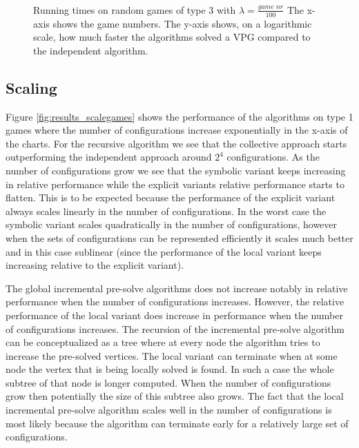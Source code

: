 \begin{figure}[H]
	\centering
	\begin{multicols}{2}
		\\\vfill
		\\
		\\\vfill
		
	\end{multicols}
	\caption{Running times on random games of type 3 with $\lambda = \frac{\textit{game nr}}{100}$ The x-axis shows the game numbers. The y-axis shows, on a logarithmic scale, how much faster the algorithms solved a VPG compared to the independent algorithm.}
	\label{fig:results_type3}
\end{figure}%

\subsection{Scaling}
Figure \ref{fig:results_scalegames} shows the performance of the algorithms on type 1 games where the number of configurations increase exponentially in the x-axis of the charts. For the recursive algorithm we see that the collective approach starts outperforming the independent approach around $2^4$ configurations. As the number of configurations grow we see that the symbolic variant keeps increasing in relative performance while the explicit variants relative performance starts to flatten. This is to be expected because the performance of the explicit variant always scales linearly in the number of configurations. In the worst case the symbolic variant scales quadratically in the number of configurations, however when the sets of configurations can be represented efficiently it scales much better and in this case sublinear (since the performance of the local variant keeps increasing relative to the explicit variant).

The global incremental pre-solve algorithms does not increase notably in relative performance when the number of configurations increases. However, the relative performance of the local variant does increase in performance when the number of configurations increases. The recursion of the incremental pre-solve algorithm can be conceptualized as a tree where at every node the algorithm tries to increase the pre-solved vertices. The local variant can terminate when at some node the vertex that is being locally solved is found. In such a case the whole subtree of that node is longer computed. When the number of configurations grow then potentially the size of this subtree also grows. The fact that the local incremental pre-solve algorithm scales well in the number of configurations is most likely because the algorithm can terminate early for a relatively large set of configurations.

